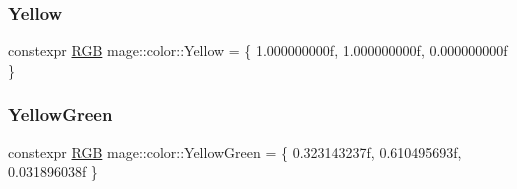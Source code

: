 \hypertarget{namespacemage_1_1color_a4b2488da6699545c05afaf136a5315e5}{}\label{namespacemage_1_1color_a4b2488da6699545c05afaf136a5315e5} 
\subsubsection{\texorpdfstring{Yellow}{Yellow}}
{\footnotesize\ttfamily constexpr \hyperlink{structmage_1_1_r_g_b}{R\+GB} mage\+::color\+::\+Yellow = \{ 1.\+000000000f, 1.\+000000000f, 0.\+000000000f \}}

\hypertarget{namespacemage_1_1color_a72c9b049fd1448d89ff65a5e9cabe044}{}\label{namespacemage_1_1color_a72c9b049fd1448d89ff65a5e9cabe044} 
\subsubsection{\texorpdfstring{Yellow\+Green}{YellowGreen}}
{\footnotesize\ttfamily constexpr \hyperlink{structmage_1_1_r_g_b}{R\+GB} mage\+::color\+::\+Yellow\+Green = \{ 0.\+323143237f, 0.\+610495693f, 0.\+031896038f \}}

